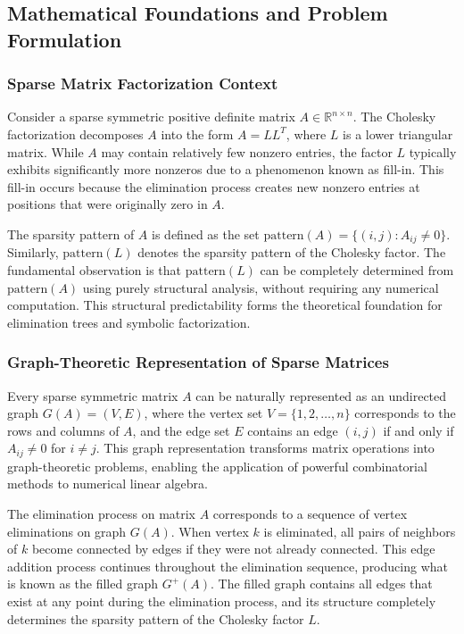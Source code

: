 \subsection{Mathematical Foundations and Problem Formulation}

\subsubsection{Sparse Matrix Factorization Context}
Consider a sparse symmetric positive definite matrix $A \in \mathbb{R}^{n \times n}$. The Cholesky factorization decomposes $A$ into the form $A = LL^T$, where $L$ is a lower triangular matrix. While $A$ may contain relatively few nonzero entries, the factor $L$ typically exhibits significantly more nonzeros due to a phenomenon known as fill-in. This fill-in occurs because the elimination process creates new nonzero entries at positions that were originally zero in $A$.

The sparsity pattern of $A$ is defined as the set $\text{pattern}(A) = \{(i,j) : A_{ij} \neq 0\}$. Similarly, $\text{pattern}(L)$ denotes the sparsity pattern of the Cholesky factor. The fundamental observation is that $\text{pattern}(L)$ can be completely determined from $\text{pattern}(A)$ using purely structural analysis, without requiring any numerical computation. This structural predictability forms the theoretical foundation for elimination trees and symbolic factorization.

\subsubsection{Graph-Theoretic Representation of Sparse Matrices}
Every sparse symmetric matrix $A$ can be naturally represented as an undirected graph $G(A) = (V, E)$, where the vertex set $V = \{1, 2, \ldots, n\}$ corresponds to the rows and columns of $A$, and the edge set $E$ contains an edge $(i,j)$ if and only if $A_{ij} \neq 0$ for $i \neq j$. This graph representation transforms matrix operations into graph-theoretic problems, enabling the application of powerful combinatorial methods to numerical linear algebra.

The elimination process on matrix $A$ corresponds to a sequence of vertex eliminations on graph $G(A)$. When vertex $k$ is eliminated, all pairs of neighbors of $k$ become connected by edges if they were not already connected. This edge addition process continues throughout the elimination sequence, producing what is known as the filled graph $G^+(A)$. The filled graph contains all edges that exist at any point during the elimination process, and its structure completely determines the sparsity pattern of the Cholesky factor $L$.

